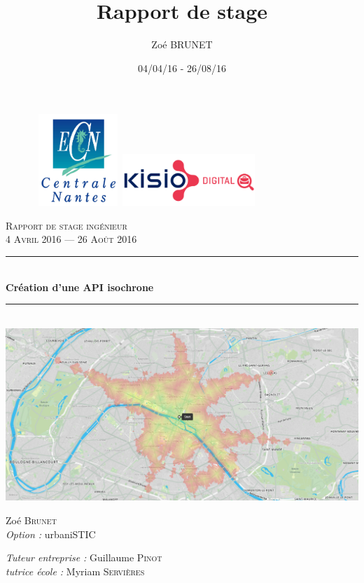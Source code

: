\documentclass[a4paper]{report}
\title{Rapport de stage}
\author{Zoé BRUNET}
\date{04/04/16 - 26/08/16}
\newcommand{\HRule}{\rule{\linewidth}{0.5mm}}
\begin{document}
\begin{titlepage}
	\begin{figure}
		\hbox{
			\hspace*{1cm}
			\includegraphics[width=3cm]{image/logo_centrale_nantes}
			\hspace{7cm}
			\includegraphics[width=5cm]{image/logo_kisio} \\[2.5cm]
		}
	\end{figure}
	\begin{center}
	\textsc{\Large Rapport de stage ingénieur}\\[1cm]
	\textsc{\large 4 Avril 2016 — 26 Août 2016}\\[2cm]
 	\HRule \\[0.4cm]
		{\huge \bfseries Création d'une API isochrone}
	\HRule \\[2cm]	
	 \includegraphics[width=\linewidth]{image/iso_garde}
    \\[1.6cm]
	    \begin{minipage}{0.46\textwidth}
      \begin{flushleft} \large
        Zoé \textsc{Brunet}\\
        \emph{Option :} urbaniSTIC\\
      \end{flushleft}
    \end{minipage}
    \begin{minipage}{0.46\textwidth}
      \begin{flushright} \large
        \emph{Tuteur entreprise :} Guillaume \textsc{Pinot}\\
        \emph{tutrice école : } Myriam \textsc{Servières}
      \end{flushright}
    \end{minipage}
        \vfill
    	\end{center}
\end{titlepage} 
\tableofcontents 
\newpage
\end{document}
